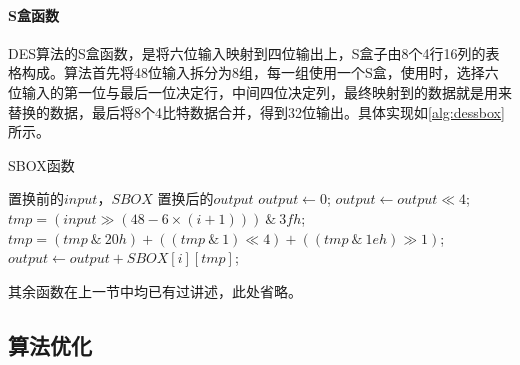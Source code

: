 \documentclass[a4paper, zihao=-4, UTF-8]{ctexart}
\begin{document}
            	\paragraph{S盒函数} DES算法的S盒函数，是将六位输入映射到四位输出上，S盒子由8个4行16列的表格构成。算法首先将48位输入拆分为8组，每一组使用一个S盒，使用时，选择六位输入的第一位与最后一位决定行，中间四位决定列，最终映射到的数据就是用来替换的数据，最后将8个4比特数据合并，得到32位输出。具体实现如\cref{alg:dessbox}所示。
            	\begin{algorithm}[htbp]
            		\caption{SBOX函数}
            		\label{alg:dessbox}
            		\begin{algorithmic}[1]
            			\Require 置换前的$input$，$SBOX$
            			\Ensure 置换后的$output$
            			\State $output \gets 0$;
            				\State $output \gets output \ll 4$;
            				\State $tmp = (input\gg (48-6\times(i+1)))\ \&\ 3fh$;
            				\State $tmp = (tmp\ \&\ 20h) + ((tmp\ \&\ 1) \ll 4)+((tmp\ \&\ 1eh)\gg 1)$;
            				\State $output \gets output + SBOX[i][tmp]$;
            			\EndFor
            			\State {}
            			\EndFunction
            		\end{algorithmic}
            	\end{algorithm}
				\par 其余函数在上一节中均已有过讲述，此处省略。
            \subsection{算法优化}
\end{document}
